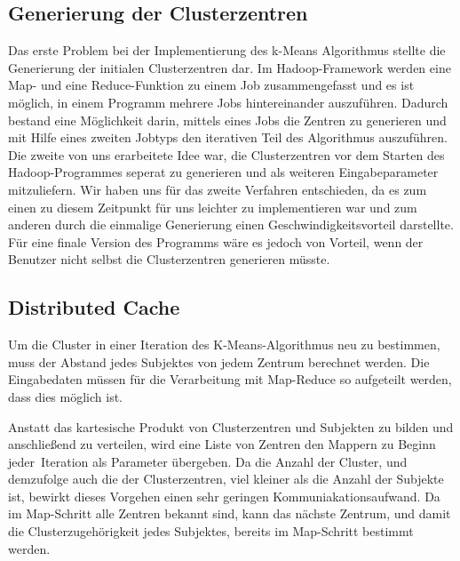 \documentclass[a4paper]{llncs}
\begin{document}
\subsection{Generierung der Clusterzentren}
Das erste Problem bei der Implementierung des k-Means Algorithmus stellte die Generierung der initialen Clusterzentren dar. Im Hadoop-Framework werden eine Map- und eine Reduce-Funktion zu einem Job zusammengefasst und es ist möglich, in einem Programm mehrere Jobs hintereinander auszuführen. Dadurch bestand eine Möglichkeit darin, mittels eines Jobs die Zentren zu generieren und mit Hilfe eines zweiten Jobtyps den iterativen Teil des Algorithmus auszuführen. Die zweite von uns erarbeitete Idee war, die Clusterzentren vor dem Starten des Hadoop-Programmes seperat zu generieren und als weiteren Eingabeparameter mitzuliefern. Wir haben uns für das zweite Verfahren entschieden, da es zum einen zu diesem Zeitpunkt für uns leichter zu implementieren war und zum anderen durch die einmalige Generierung einen Geschwindigkeitsvorteil darstellte. Für eine finale Version des Programms wäre es jedoch von Vorteil, wenn der Benutzer nicht selbst die Clusterzentren generieren müsste.


\subsection{Distributed Cache}

Um die Cluster in einer Iteration des K-Means-Algorithmus neu zu bestimmen, muss der Abstand jedes Subjektes von jedem Zentrum berechnet werden. Die Eingabedaten müssen für die Verarbeitung mit Map-Reduce so aufgeteilt werden, dass dies möglich ist.

Anstatt das kartesische Produkt von Clusterzentren und Subjekten zu bilden und anschließend zu verteilen, wird eine Liste von Zentren den Mappern zu Beginn jeder Iteration als Parameter übergeben. Da die Anzahl der Cluster, und demzufolge auch die der Clusterzentren, viel kleiner als die Anzahl der Subjekte ist, bewirkt dieses Vorgehen einen sehr geringen Kommuniakationsaufwand. Da im Map-Schritt alle Zentren bekannt sind, kann das nächste Zentrum, und damit die Clusterzugehörigkeit jedes Subjektes, bereits im Map-Schritt bestimmt werden. 
\end{document}
